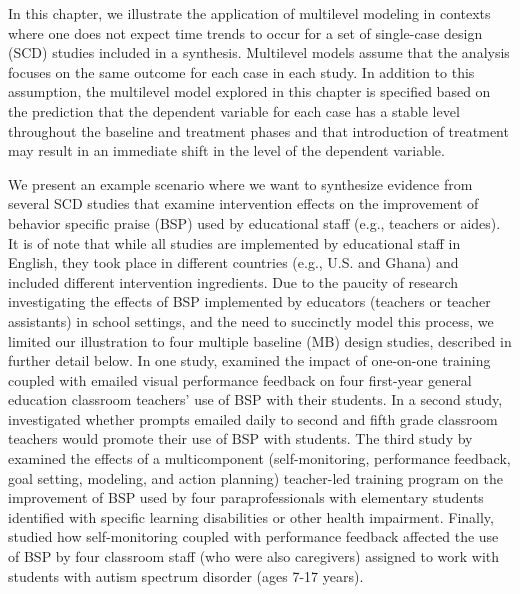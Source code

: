 \documentclass[
]{book}
\begin{document}
In this chapter, we illustrate the application of multilevel modeling in contexts where one does not expect time trends to occur for a set of single-case design (SCD) studies included in a synthesis. Multilevel models assume that the analysis focuses on the same outcome for each case in each study. In addition to this assumption, the multilevel model explored in this chapter is specified based on the prediction that the dependent variable for each case has a stable level throughout the baseline and treatment phases and that introduction of treatment may result in an immediate shift in the level of the dependent variable.

We present an example scenario where we want to synthesize evidence from several SCD studies that examine intervention effects on the improvement of behavior specific praise (BSP) used by educational staff (e.g., teachers or aides). It is of note that while all studies are implemented by educational staff in English, they took place in different countries (e.g., U.S. and Ghana) and included different intervention ingredients. Due to the paucity of research investigating the effects of BSP implemented by educators (teachers or teacher assistants) in school settings, and the need to succinctly model this process, we limited our illustration to four multiple baseline (MB) design studies, described in further detail below.
In one study, \citet{Gage2018} examined the impact of one-on-one training coupled with emailed visual performance feedback on four first-year general education classroom teachers' use of BSP with their students. In a second study, \citet{CollierMeek2017} investigated whether prompts emailed daily to second and fifth grade classroom teachers would promote their use of BSP with students. The third study by \citet{Sallese_Vannest_2022} examined the effects of a multicomponent (self-monitoring, performance feedback, goal setting, modeling, and action planning) teacher-led training program on the improvement of BSP used by four paraprofessionals with elementary students identified with specific learning disabilities or other health impairment. Finally, \citet{knochel2021culturally} studied how self-monitoring coupled with performance feedback affected the use of BSP by four classroom staff (who were also caregivers) assigned to work with students with autism spectrum disorder (ages 7-17 years).
\end{document}

